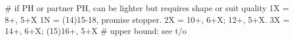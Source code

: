 # if PH or partner PH, can be lighter but requires shape or suit quality
1X = 8+, 5+X
1N = (14)15-18, promise stopper.
2X = 10+, 6+X; 12+, 5+X.
3X = 14+, 6+X; (15)16+, 5+X
# upper bound: see t/o